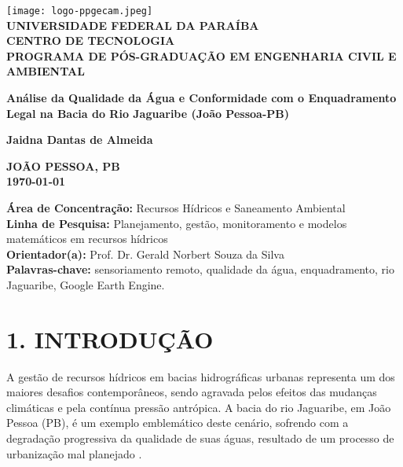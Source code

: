 \documentclass[12pt, a4paper]{article}
\begin{document}
\renewcommand{\bibname}{REFERÊNCIAS} %


\begin{titlepage}
    \centering
    \vspace*{0.5cm}
    \texttt{[image: logo-ppgecam.jpeg]}\\[0.2cm]
    \vspace*{0.5cm}
    \textbf{\small UNIVERSIDADE FEDERAL DA PARAÍBA \\
    CENTRO DE TECNOLOGIA \\
    PROGRAMA DE PÓS-GRADUAÇÃO EM ENGENHARIA CIVIL E AMBIENTAL}
    \vspace{3cm}
    
    \textbf{\Huge Análise da Qualidade da Água e Conformidade com o Enquadramento Legal na Bacia do Rio Jaguaribe (João Pessoa-PB)}
    \vspace{3cm}
    
    \textbf{\large Jaidna Dantas de Almeida}
    \vfill
    
    \textbf{JOÃO PESSOA, PB \\ \today}
\end{titlepage}

\begin{center}
    \textbf{Área de Concentração:} Recursos Hídricos e Saneamento Ambiental \\
    \textbf{Linha de Pesquisa:} Planejamento, gestão, monitoramento e modelos matemáticos em recursos hídricos \\
    \textbf{Orientador(a):} Prof. Dr. Gerald Norbert Souza da Silva \\
    \textbf{Palavras-chave:} sensoriamento remoto, qualidade da água, enquadramento, rio Jaguaribe, Google Earth Engine.
\end{center}

\newpage

\section*{1. INTRODUÇÃO}
A gestão de recursos hídricos em bacias hidrográficas urbanas representa um dos maiores desafios contemporâneos, sendo agravada pelos efeitos das mudanças climáticas e pela contínua pressão antrópica. A bacia do rio Jaguaribe, em João Pessoa (PB), é um exemplo emblemático deste cenário, sofrendo com a degradação progressiva da qualidade de suas águas, resultado de um processo de urbanização mal planejado \cite{santos2016}.
\end{document}
